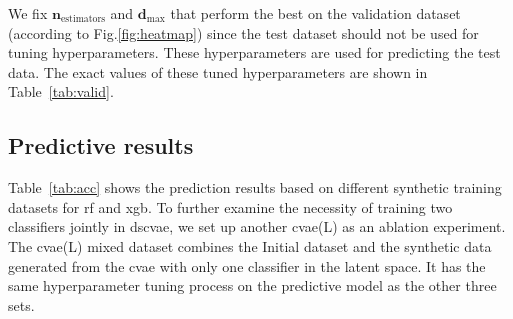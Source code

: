 \documentclass[twoside,twocolumn,9pt]{article}
\begin{document}
\begin{table*}[!htb]
\centering
\caption{Test results using Initial or mixed datasets}
\label{tab:acc}
\end{table*}
We fix $\mathbf{n}_\textrm{estimators}$ and $\mathbf{d}_\textrm{max}$ that perform the best on the validation dataset (according to Fig.\ref{fig:heatmap}) since the test dataset should not be used for tuning hyperparameters. These hyperparameters are used for predicting the test data. The exact values of these tuned hyperparameters are shown in Table~\ref{tab:valid}. 

\subsection{Predictive results}
Table~\ref{tab:acc} shows the prediction results based on different synthetic training datasets for \acrshort*{rf} and \acrlong*{xgb}. To further examine the necessity of training two classifiers jointly in \acrshort*{dscvae}, we set up another \acrshort*{cvae}(L) as an ablation experiment. The \acrshort*{cvae}(L) mixed dataset combines the Initial dataset and the synthetic data generated from the \acrshort*{cvae} with only one classifier in the latent space. It has the same hyperparameter tuning process on the predictive model as the other three sets. 
\end{document}
